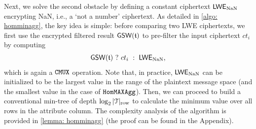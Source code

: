 


Next, we solve the second obstacle by defining a constant ciphertext ${\mathsf{LWE_{\rm NaN}}}$
encrypting NaN, i.e., a `not a number' ciphertext. As detailed in
\cref{algo: homminagg}, the key idea is simple:
before comparing two LWE ciphertexts, 
we first use the encrypted filtered result ${\mathsf{GSW}}({\mathfrak{t}})$
to pre-filter the input ciphertext $ct_i$ by computing 
\begin{align}\label{eq:lwenan}
{\mathsf{GSW}}({\mathfrak{t}})\text{ }?\text{ }ct_i\text{ }:\text{ }{\mathsf{LWE_{\rm NaN}}},
\end{align}
which is again a $\texttt{CMUX}$ operation. Note that,
in practice, ${\mathsf{LWE_{\rm NaN}}}$ can be initialized to be the largest 
value in the range of the plaintext message space (and the smallest
value in the case of ${\texttt{HomMAXAgg}}$).
Then, we can proceed to build a conventional 
min-tree of depth $\log_{2}{|\mathcal{T}|_{\rm row}}$
to calculate the minimum value over all rows in the attribute
column. 
The complexity analysis of the algorithm is provided in 
\cref{lemma: homminagg} (the proof can be found in the Appendix).

